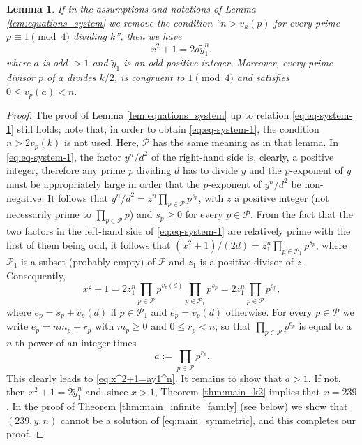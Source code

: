 \documentclass[12pt]{amsart}
\numberwithin{equation}{section}
\newtheorem{lemma}{Lemma}[section]
\theoremstyle{definition}
\theoremstyle{remark}
\newcommand{\cP}{\mathcal{P}}
\newcommand{\ty}{\tilde{y}}
\begin{document}
\begin{lemma} \label{lem:factorization_without_condition}
If in the assumptions and notations of Lemma \ref{lem:equations_system} we
remove the condition ``$n>v_k(p)$ for every prime $p\equiv 1\pmod 4$ dividing
$k$'', then we have
%
\begin{equation} \label{eq:x^2+1=ay1^n}
    x^2 + 1=2a\ty_1^{n},
\end{equation}
%
where $a$ is odd $> 1$ and $\ty_1$ is an odd positive integer. Moreover, every 
prime divisor $p$ of $a$ divides $k/2$, is congruent to $1\pmod 4$ and satisfies 
$0\leq v_p(a) < n$.
\end{lemma}
%
\begin{proof}
The proof of Lemma \ref{lem:equations_system} up to relation \eqref{eq:eq-system-1} still holds; note that, in order to obtain \eqref{eq:eq-system-1}, the condition $n>2v_p(k)$ is not used. Here, $\cP$ has the same meaning as in that lemma.    
In \eqref{eq:eq-system-1}, the factor $y^n/d^2$ of the right-hand side is, 
clearly, a positive integer, therefore any prime $p$ dividing $d$ has to divide 
$y$ and the $p$-exponent of $y$ must be appropriately large in order that the 
$p$-exponent of $y^n/d^2$ be non-negative. It follows that 
$y^n/d^2=z^n\prod_{p\in\cP}p^{s_p}$, with $z$ a positive integer (not 
necessarily prime to $\prod_{p\in\cP}p$) and $s_p\ge 0$ for every $p\in\cP$. 
From the fact that the two factors in the left-hand side of 
\eqref{eq:eq-system-1} are relatively prime with the first of them being odd, it 
follows that $(x^2+1)/(2d)=z_1^n\prod_{p\in\cP_1}p^{s_p}$, where $\cP_1$ is a 
subset (probably empty) of $\cP$ and $z_1$ is a positive divisor of $z$. 
Consequently,
\begin{equation*}
x^2+1=2z_1^n\prod_{p\in\cP}p^{v_p(d)}\prod_{p\in\cP_1}p^{s_p}
    =2z_1^n\prod_{p\in\cP}p^{e_p},
\end{equation*}
where $e_p=s_p+v_p(d)$ if $p\in\cP_1$ and $e_p=v_p(d)$ otherwise. For every $p\in\cP$ we write $e_p=nm_p+r_p$ with $m_p\ge 0$ and $0\le r_p<n$, so that $\prod_{p\in\cP}p^{e_p}$ is equal to a $n$-th power of an integer times 
\begin{equation*}
    a:=\prod_{p\in\cP}p^{r_p}.
\end{equation*}
This clearly leads to \eqref{eq:x^2+1=ay1^n}. It remains to show that $a>1$. If 
not, then $x^2+1=2\ty_1^n$ and, since $x>1$, Theorem \ref{thm:main_k2} implies
that $x=239$. In the proof of Theorem \ref{thm:main_infinite_family} (see below) 
we show that $(239,y,n)$ cannot be a solution of \eqref{eq:main_symmetric}, and 
this completes our proof.
\end{proof}
%
\end{document}
